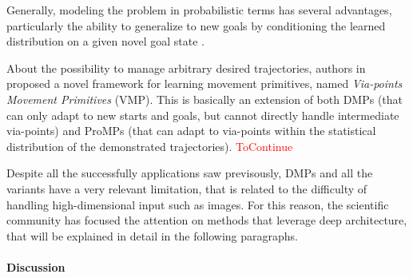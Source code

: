 Generally, modeling the problem in probabilistic terms has several advantages, particularly the ability to generalize to new goals by conditioning the learned distribution on a given novel goal state \cite{saveriano2023dynamic}.

About the possibility to manage arbitrary desired trajectories, authors in \cite{zhou2019learning} proposed a novel framework for learning movement primitives, named \textit{Via-points Movement Primitives} (VMP). This is basically an extension of both DMPs (that can only adapt to new starts and goals, but cannot directly handle intermediate via-points) and ProMPs (that can adapt to via-points within the statistical distribution of the demonstrated trajectories).
\textcolor{red}{ToContinue}

Despite all the successfully applications saw previsously, DMPs and all the variants have a very relevant limitation, that is related to the difficulty of handling high-dimensional input such as images. For this reason, the scientific community has focused the attention on methods that leverage deep architecture, that will be explained in detail in the following paragraphs.






\paragraph{Discussion}